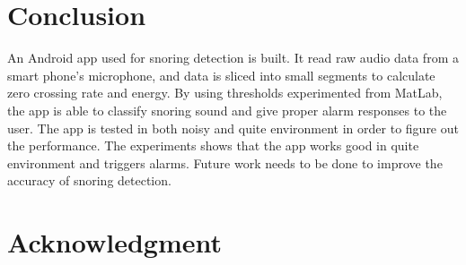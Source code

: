\documentclass[conference]{IEEEtran}
\begin{document}
%





\section{Conclusion}

An Android app used for snoring detection is built. It read raw audio data from a smart phone's microphone, and data is sliced into small segments to calculate zero crossing rate and energy. By using thresholds experimented from MatLab, the app is able to classify snoring sound and give proper alarm responses to the user. The app is tested in both noisy and quite environment in order to figure out the performance. The experiments shows that the app works good in quite environment and triggers alarms. Future work needs to be done to improve the accuracy of snoring detection.



\section*{Acknowledgment}
\end{document}
